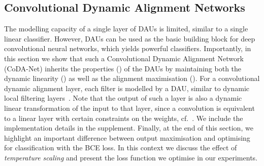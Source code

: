 \subsection{Convolutional Dynamic Alignment Networks}
\label{subsec:coda}
The modelling capacity of a single layer of DAUs is limited, similar to a single linear classifier. However, DAUs can be used as the basic building block for deep convolutional neural networks, which yields powerful classifiers. Importantly, in this section we show that such a Convolutional Dynamic Alignment Network (CoDA-Net) inherits the properties () of the DAUs by maintaining both the dynamic linearity () as well as the alignment maximisation (). For a convolutional dynamic alignment layer, each filter is modelled by a DAU, similar to dynamic local filtering layers~\cite{jia2016dynamic}. Note that the output of such a layer is also a dynamic linear transformation of the input to that layer, since a convolution is equivalent to a linear layer with certain constraints on the weights, cf.~\cite{convlin}. We include the implementation details in the supplement.
Finally, at the end of this section, we highlight an important difference between output maximisation and optimising for classification with the {BCE} loss. In this context we discuss the effect of \emph{temperature scaling} and present the loss function we optimise in our experiments.


